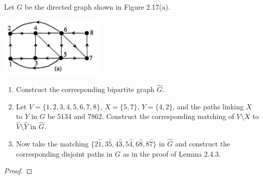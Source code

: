 \prob
{
    Let $G$ be the directed graph shown in Figure 2.17(a).
            \begin{center}
                \includegraphics[width=5cm]{Test2/Problem12/DirectedGraphs.png}
            \end{center}\pn
    
    \begin{enumerate}[label=(\roman*)]
        \item   Construct the corresponding bipartite graph $\hat{G}$.
        \item   Let $V = \{1,2,3,4,5,6,7,8\}$, $X=\{5,7\}$, $Y=\{4,2\}$,
                and the paths linking $X$ to $Y$ in $G$ be 5134 and 7862. Construct the
                corresponding matching of $V \setminus X$ to $\hat{V} \setminus \hat{Y}$ in $\hat{G}$.
        \item   Now take the matching $\{2\hat{1}, 3\hat{5}, 4\hat{3}, 5\hat{4}, 6\hat{8}, 8\hat{7}\}$ in $\hat{G}$ and 
                construct the corresponding disjoint paths in $G$ as in the proof of Lemma 2.4.3.
    \end{enumerate}
}
\begin{proof}
\end{proof}